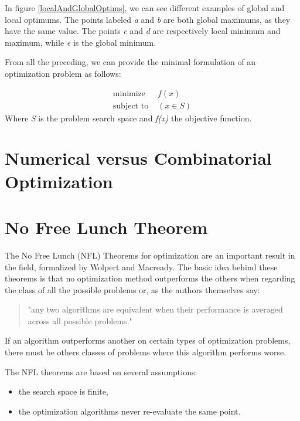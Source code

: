 In figure \ref{localAndGlobalOptims}, we can see different examples of global and local optimums. The points labeled \emph{a} and \emph{b} are both global maximums, as they have the same value. The points
\emph{c} and \emph{d} are respectively local minimum and maximum, while \emph{e} is the global minimum.

From all the preceding, we can provide the minimal formulation of an optimization problem as follows:

\begin{align*}
\text{minimize } &f(x) \\
\text{subject to } &(x \in S)
\end{align*}
Where \emph{S} is the problem search space and \emph{f(x)} the objective function.

\section{Numerical versus Combinatorial Optimization}

\section{No Free Lunch Theorem}

The No Free Lunch (NFL) Theorems for optimization are an important result in the field, formalized by Wolpert and Macready\cite{585893}. The basic idea behind these theorems is that no optimization method outperforms the others when regarding the class of all the possible problems or, as the authors themselves say:
\begin{quote}
"any two algorithms are equivalent when their performance is averaged across all possible problems."
\end{quote}
If an algorithm outperforms another on certain types of optimization problems, there must be others classes of problems where this algorithm performs worse.

The NFL theorems are based on several assumptions:
\begin{itemize}

\item the search space is finite,

\item the optimization algorithms never re-evaluate the same point.

\end{itemize}


